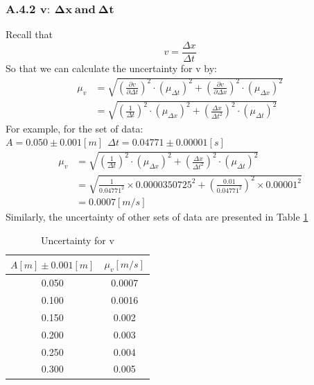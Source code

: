 \documentclass[11pt,a4paper]{article}
\begin{document}
\subsubsection*{A.4.2 $\mathbf{v:\ \Delta x\ and\ \Delta t}$}
\qquad Recall that $$v=\frac{\Delta x}{\Delta t}$$
\qquad So that we can calculate the uncertainty for v by:
\begin{equation*}
    \begin{split}
        \mu_v&=\sqrt{\left(\frac{\partial v}{\partial \Delta t}\right)^2\cdot (\mu_{\Delta t})^2+\left(\frac{\partial v}{\partial \Delta x}\right)^2\cdot (\mu_{\Delta x})^2}\\
        &=\sqrt{\left(\frac{1}{\Delta t}\right)^2\cdot (\mu_{\Delta x})^2+\left(\frac{\Delta x}{\Delta t^2}\right)^2\cdot (\mu_{\Delta t})^2}
    \end{split}
\end{equation*}
\qquad For example, for the set of data: $A=0.050\pm0.001[m]\ \ \Delta t=0.04771\pm0.00001[s]$
\begin{equation*}
    \begin{split}
        \mu_v&=\sqrt{\left(\frac{1}{\Delta t}\right)^2\cdot (\mu_{\Delta x})^2+\left(\frac{\Delta x}{\Delta t^2}\right)^2\cdot (\mu_{\Delta t})^2}\\
        &=\sqrt{\frac{1}{0.04771^2}\times 0.0000350725^2+\left(\frac{0.01}{0.04771^2}\right)^2\times 0.00001^2}\\
        &=0.0007[m/s]
    \end{split}
\end{equation*}
\qquad Similarly, the uncertainty of other sets of data are presented in Table \ref{uncertainty of mu v}
\\
\begin{table}[h]
    \centering
    \begin{tabular}{|c|c|}\hline
    $A[m]\pm 0.001[m]$& $\mu_v[m/s]$\\\hline
    0.050 & 0.0007 \\
    0.100 & 0.0016 \\
    0.150 & 0.002  \\
    0.200 & 0.003  \\
    0.250 & 0.004  \\
    0.300 & 0.005 \\\hline
    \end{tabular}
    \caption{Uncertainty for v}
    \label{uncertainty of mu v}
\end{table}
\newpage
\end{document}
